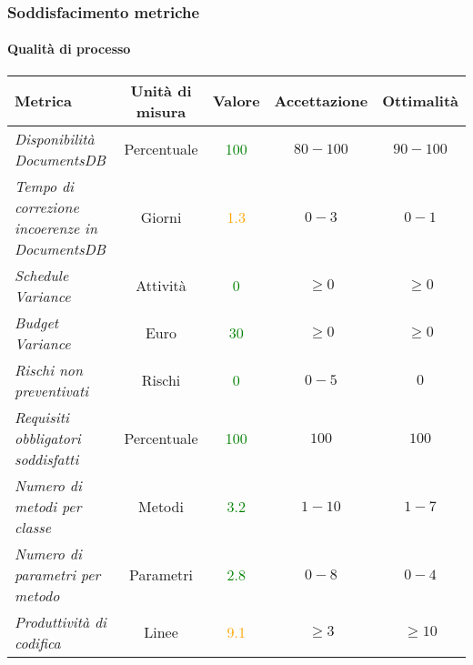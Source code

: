 \newpage
\subsubsection{Soddisfacimento metriche}

\paragraph{Qualità di processo}
\begin{longtable}{|>{\centering}m{5cm}|c|c|c|c|}
\hline
\textbf{Metrica} & \textbf{Unità di misura} & \textbf{Valore} & \textbf{Accettazione} & \textbf{Ottimalità}\\
\hline
\endhead
\emph{Disponibilità DocumentsDB} & {Percentuale} & \textcolor{Green}{100} & $80 - 100$ & $90 - 100$\\ \hline
\emph{Tempo di correzione incoerenze in DocumentsDB} & {Giorni} & \textcolor{Orange}{1.3} & $0 - 3$ & $0 - 1$\\ \hline
\emph{Schedule Variance} & {Attività} & \textcolor{Green}{0} & $\geq 0$  & $\geq 0$\\ \hline
\emph{Budget Variance} & {Euro} & \textcolor{Green}{30} & $\geq 0$ & $\geq 0$\\ \hline
\emph{Rischi non preventivati} & {Rischi} & \textcolor{Green}{0} & $0 - 5$ & $0$\\ \hline
\emph{Requisiti obbligatori soddisfatti} & {Percentuale} & \textcolor{Green}{100} & $100$ & $100$\\ \hline
\emph{Numero di metodi per classe} & {Metodi} & \textcolor{Green}{3.2} & $1 - 10$ & $1 - 7$\\ \hline
\emph{Numero di parametri per metodo} & {Parametri} & \textcolor{Green}{2.8} & $0 - 8$ & $0 - 4$\\ \hline
\emph{Produttività di codifica} & {Linee} & \textcolor{Orange}{9.1} & $\geq 3$ & $\geq 10$\\ \hline

\end{longtable}
